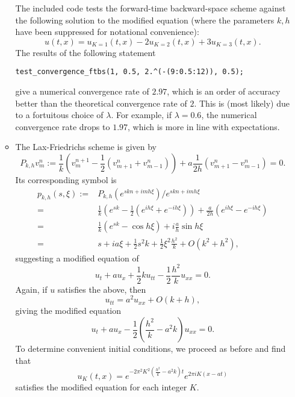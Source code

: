 \documentclass{article}
\begin{document}
\begin{itemize}
\begin{itemize}
The included code tests the forward-time backward-space scheme against the following solution to the modified equation (where the parameters $k,h$ have been suppressed for notational convenience):
\begin{equation*}
u(t,x) = u_{K=1}(t,x) - 2 u_{K=2}(t,x) + 3 u_{K=3}(t,x).
\end{equation*}
The results of the following statement
\begin{verbatim}
test_convergence_ftbs(1, 0.5, 2.^(-(9:0.5:12)), 0.5);
\end{verbatim}
give a numerical convergence rate of $2.97$, which is an order of accuracy better than the theoretical convergence rate of $2$. This is (most likely) due to a fortuitous choice of $\lambda$. For example, if $\lambda = 0.6$, the numerical convergence rate drops to $1.97$, which is more in line with expectations.

\item The Lax-Friedrichs scheme is given by
\begin{equation*}
P_{k,h} v^n_m := \frac{1}{k} \left( v^{n+1}_m - \frac{1}{2} \left( v^n_{m+1} + v^n_{m-1} \right) \right) + a \frac{1}{2h} \left( v^n_{m+1} - v^n_{m-1} \right) = 0.
\end{equation*}
Its corresponding symbol is
\begin{align*}
p_{k,h}(s,\xi) := {} & P_{k,h} \left( e^{skn + imh\xi} \right) / e^{skn + imh\xi} \\
                = {} & \frac{1}{k} \left( e^{sk} - \frac{1}{2} \left( e^{ih\xi} + e^{-ih\xi} \right) \right) + \frac{a}{2h} \left( e^{ih\xi} - e^{-ih\xi} \right) \\
                = {} & \frac{1}{k} \left( e^{sk} - \cos h\xi \right) + i \frac{a}{h} \sin h\xi \\
                = {} & s + i a \xi + \frac{1}{2} s^2 k + \frac{1}{2} \xi^2 \frac{h^2}{k} + O \left( k^2 + h^2 \right),
\end{align*}
suggesting a modified equation of
\begin{equation*}
u_t + a u_x + \frac{1}{2} k u_{tt} - \frac{1}{2} \frac{h^2}{k} u_{xx} = 0.
\end{equation*}
Again, if $u$ satisfies the above, then
\begin{equation*}
u_{tt} = a^2 u_{xx} + O \left( k + h \right),
\end{equation*}
giving the modified equation
\begin{equation*}
u_t + a u_x - \frac{1}{2} \left( \frac{h^2}{k} - a^2 k \right) u_{xx} = 0.
\end{equation*}
To determine convenient initial conditions, we proceed as before and find that
\begin{equation*}
u_K(t,x) = e^{-2 \pi^2 K^2 \left( \frac{h^2}{k} - a^2 k \right) t} e^{2 \pi i K \left( x - a t \right)}
\end{equation*}
satisfies the modified equation for each integer $K$.


\end{itemize}
\end{itemize}
\end{document}
